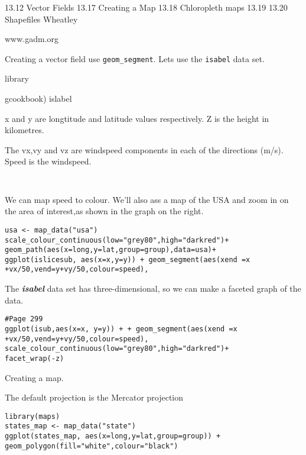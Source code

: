 13.12 Vector Fields
13.17 Creating a Map
13.18 Chloropleth maps
13.19 
13.20 Shapefiles
Wheatley

www.gadm.org

Creating a vector field
use \texttt{geom_segment}. Lets use the \texttt{isabel} data set.


library{gcookbook)
islabel

x and y are longtitude and latitude values respectively.
Z is the height in kilometres.

The vx,vy and vz are windspeed components in each of the directions (m/s).
Speed is the windspeed.

\begin{framed}
\begin{verbatim}


\end{verbatim}
\end{framed}

We can map speed to colour. We'll also ass a map of 
the USA and zoom in on the area of interest,as shown in the graph on the right.

\begin{verbatim}
usa <- map_data("usa")
scale_colour_continuous(low="grey80",high="darkred")+
geom_path(aes(x=long,y=lat,group=group),data=usa)+
ggplot(islicesub, aes(x=x,y=y)) + geom_segment(aes(xend =x +vx/50,vend=y+vy/50,colour=speed),
\end{verbatim}
The \textbf{\textit{isabel}} data set has three-dimensional, so we can make a faceted graph of the data.

\begin{verbatim}
#Page 299
ggplot(isub,aes(x=x, y=y)) + + geom_segment(aes(xend =x +vx/50,vend=y+vy/50,colour=speed),
scale_colour_continuous(low="grey80",high="darkred")+
facet_wrap(-z)
\end{verbatim}
Creating a map.

The default projection is the Mercator projection

\begin{verbatim}
library(maps)
states_map <- map_data("state")
ggplot(states_map, aes(x=long,y=lat,group=group)) + geom_polygon(fill="white",colour="black")
\end{verbatim}

}
